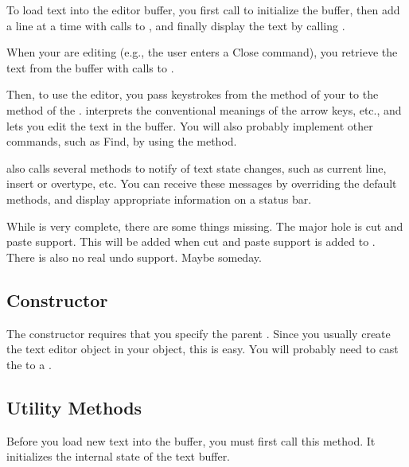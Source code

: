 To load text into the editor buffer,
you first call  to initialize the
buffer, then add a line at a time with calls to ,
and finally display the text by calling .

When your are editing (e.g., the user enters a Close command),
you retrieve the text from the  buffer
with calls to .

Then, to use the editor, you pass keystrokes from the
 method of your  to the 
method of the .  interprets
the conventional meanings of the arrow keys, etc., and lets
you edit the text in the buffer. You will also probably implement
other commands, such as Find, by using the 
method.

 also calls several methods to notify of
text state changes, such as current line, insert or overtype,
etc. You can receive these messages by overriding the default
methods, and display appropriate information on a status bar.

While  is very complete, there are some
things missing. The major hole is cut and paste support. This
will be added when cut and paste support is added to \V. There
is also no real undo support. Maybe someday.


\subsection* {Constructor} %


The  constructor requires that you specify
the parent . Since you usually create the text editor object
in your  object, this is easy. You will probably need
to cast the  to a .

\subsection* {Utility Methods} %


Before you load new text into the buffer, you must first
call this method. It initializes the internal state of
the text buffer.

